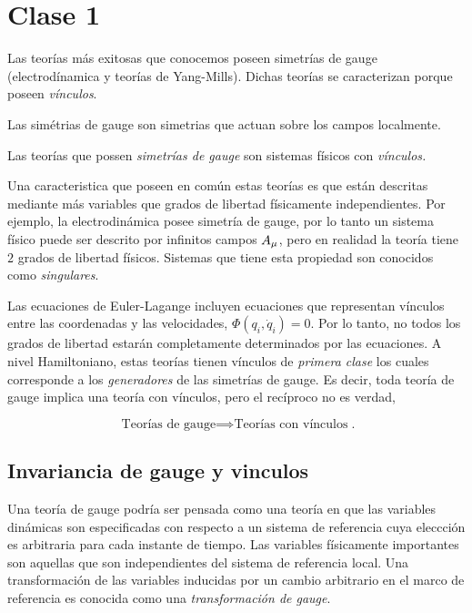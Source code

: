 \section{Clase 1}
Las teorías más exitosas que conocemos poseen simetrías de gauge (electrodínamica y teorías de Yang-Mills). Dichas teorías se caracterizan porque poseen \textit{vínculos}.

Las simétrias de gauge son simetrias que actuan sobre los campos localmente.

Las teorías que possen \textit{simetrías de gauge} son sistemas físicos con \textit{vínculos.}

Una caracteristica que poseen en común estas teorías es que están descritas mediante más variables que grados de libertad físicamente independientes. Por ejemplo, la electrodinámica posee simetría de gauge, por lo tanto un sistema físico puede ser descrito por infinitos campos $A_\mu $, pero en realidad la teoría tiene $2$ grados de libertad físicos. Sistemas que tiene esta propiedad son conocidos como \textit{singulares}.


Las ecuaciones de Euler-Lagange incluyen ecuaciones que representan vínculos entre las coordenadas y las velocidades, $\Phi(q_i,\dot{q}_i)=0$. Por lo tanto, no todos los grados de libertad estarán completamente determinados por las ecuaciones. 
A nivel Hamiltoniano, estas teorías tienen vínculos de \textit{primera clase} los cuales corresponde a los \textit{generadores} de las simetrías de gauge. Es decir, toda teoría de gauge implica una teoría con vínculos, pero el recíproco no es verdad,

\begin{equation}
  \boxed{\text{Teorías de gauge} \implies \text{Teorías con vínculos}}.
\end{equation}


\subsection{Invariancia de gauge y vinculos}
Una teoría de gauge podría ser pensada como una teoría en que las variables dinámicas son especificadas con respecto a un sistema de referencia cuya eleccción es arbitraria para cada instante de tiempo. Las variables físicamente importantes son aquellas que son independientes del sistema de referencia local. Una transformación de las variables inducidas por un cambio arbitrario en el marco de referencia es conocida como una \textit{transformación de gauge}.


